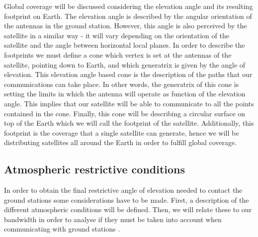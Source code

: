 Global coverage will be discussed considering the elevation angle and its resulting footprint on Earth. The elevation angle is described by the angular orientation of the antennas in the ground station. However, this angle is also perceived by the satellite in a similar way - it will vary depending on the orientation of the satellite and the angle between horizontal local planes. In order to describe the footprints we must define a cone which vertex is set at the antennas of the satellite, pointing down to Earth, and which generatrix is given by the angle of elevation. This elevation angle based cone is the description of the paths that our communications can take place. In other words, the generatrix of this cone is setting the limits in which the antenna will operate as function of the elevation angle. This implies that our satellite will be able to communicate to all the points contained in the cone. Finally, this cone will be describing a circular surface on top of the Earth which we will call the footprint of the satellite. Additionally, this footprint is the coverage that a single satellite can generate, hence we will be distributing satellites all around the Earth in order to fulfill global coverage. 



\subsection{Atmospheric restrictive conditions}
In order to obtain the final restrictive angle of elevation needed to contact the ground stations some considerations have to be made. First, a description of the different atmospheric conditions will be defined. Then, we will relate these to our bandwidth in order to analyse if they must be taken into account when communicating with ground stations \cite{Gomez2013}. 
\paragraph{    }

